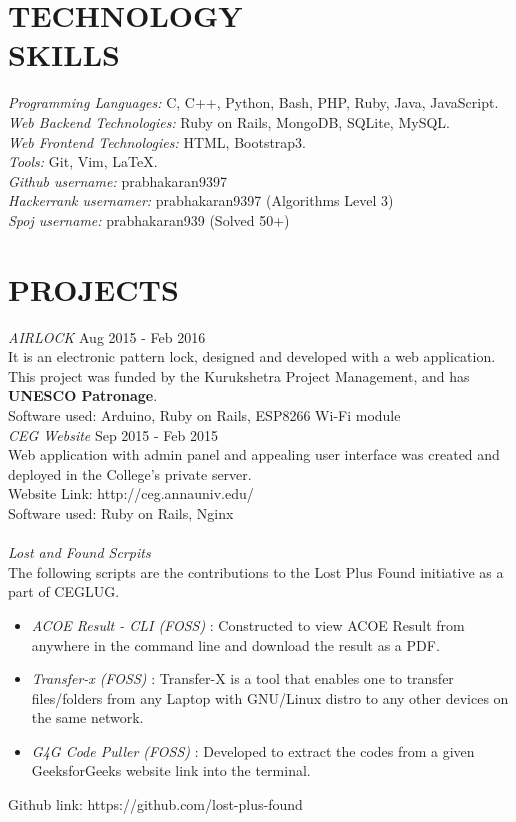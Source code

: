 \documentclass[margin, 10pt]{res} %
\begin{document}
\begin{resume}
\section{TECHNOLOGY \\ SKILLS} 

{\sl Programming Languages:} C, C++, Python, Bash, PHP, Ruby, Java, JavaScript. \\
{\sl Web Backend Technologies:} Ruby on Rails, MongoDB, SQLite, MySQL. \\
{\sl Web Frontend Technologies:} HTML, Bootstrap3. \\
{\sl Tools:} Git, Vim, LaTeX. \\
{\sl Github username:} prabhakaran9397 \\
{\sl Hackerrank usernamer:} prabhakaran9397 (Algorithms Level 3) \\
{\sl Spoj username:} prabhakaran939 (Solved 50+) \\
 
 
\section{PROJECTS}

{\sl AIRLOCK} \hfill Aug 2015 - Feb 2016 \\
It is an electronic pattern lock, designed and developed with a web application. This project was funded by the Kurukshetra Project Management, and has \textbf{UNESCO Patronage}.\\ 
Software used: Arduino, Ruby on Rails, ESP8266 Wi-Fi module \\

{\sl CEG Website} \hfill Sep 2015 - Feb 2015 \\
Web application with admin panel and appealing user interface was created and deployed in the College's private server. \\
Website Link: http://ceg.annauniv.edu/ \\
Software used: Ruby on Rails, Nginx \\
\\
{\sl Lost and Found Scrpits }  \\
The following scripts are the contributions to the Lost Plus Found initiative as a part of  CEGLUG. \\
\begin{itemize}
\item{\sl ACOE Result - CLI (FOSS)} : 
Constructed to view ACOE Result from anywhere in the command line and download the result as a PDF.
\item{\sl Transfer-x (FOSS)} : 
Transfer-X is a tool that enables one to transfer files/folders from any Laptop with GNU/Linux distro to any other devices on the same network.
\item{\sl G4G Code Puller (FOSS)} : 
Developed to extract the codes from a given GeeksforGeeks website link into the terminal.\\
\end{itemize}
Github link: https://github.com/lost-plus-found

\end{resume}
\end{document}
